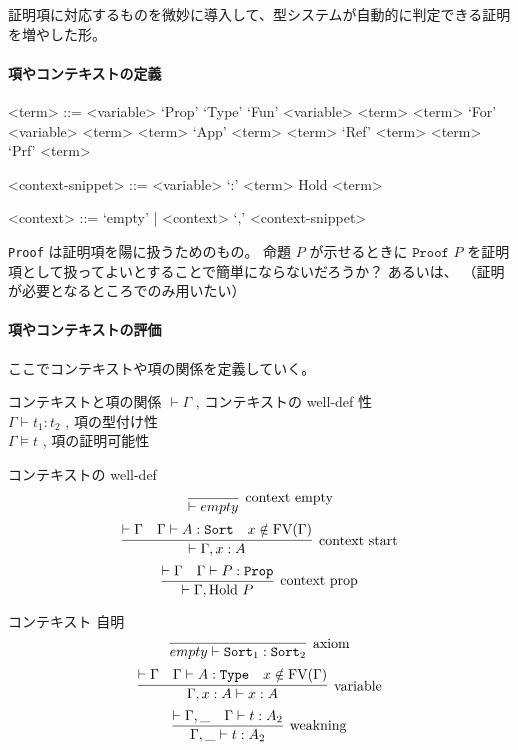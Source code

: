 証明項に対応するものを微妙に導入して、型システムが自動的に判定できる証明を増やした形。

\paragraph*{項やコンテキストの定義}
\begin{grammar}
<term> ::= <variable> 
\alt `Prop'
\alt `Type'
\alt `Fun' <variable> <term> <term>
\alt `For' <variable> <term> <term>
\alt `App' <term> <term>
\alt `Ref' <term> <term>
\alt `Prf' <term>

<context-snippet> ::= <variable> `:' <term>
\alt Hold <term>

<context> ::= `empty' | <context> `,' <context-snippet>
\end{grammar}

\texttt{Proof} は証明項を陽に扱うためのもの。
命題 \(P\) が示せるときに \(\texttt{Proof } P\) を証明項として扱ってよいとすることで簡単にならないだろうか？
あるいは、
（証明が必要となるところでのみ用いたい）

\paragraph*{項やコンテキストの評価}
ここでコンテキストや項の関係を定義していく。

\begin{itembox}[l]{コンテキストと項の関係}
  \(\vdash \Gamma\) , コンテキストの well-def 性 \\
  \(\Gamma \vdash t_1 : t_2\) , 項の型付け性 \\
  \(\Gamma \vDash t\) , 項の証明可能性
\end{itembox}

\begin{itembox}[l]{コンテキストの well-def}
  \[\infer[\text{context empty}]{\vdash empty}{}\]
  \[\infer[\text{context start}]{\vdash \Gamma , x : A}{\vdash \Gamma & \Gamma \vdash A : \texttt{Sort} & x \notin \text{FV}(\Gamma)}\]
  \[\infer[\text{context prop}]{\vdash \Gamma , \text{Hold } P}{\vdash \Gamma & \Gamma \vdash P : \texttt{Prop}}\]
\end{itembox}

\begin{itembox}[l]{コンテキスト 自明}
  \[\infer[\text{axiom}]{empty \vdash \texttt{Sort}_1 : \texttt{Sort}_2}{}\]
  \[\infer[\text{variable}]{\Gamma , x : A \vdash x : A}{\vdash \Gamma & \Gamma \vdash A : \texttt{Type} & x \notin \text{FV}(\Gamma)}\]
  \[\infer[\text{weakning}]{\Gamma , \_ \vdash t : A_2}{\vdash \Gamma , \_ & \Gamma \vdash t : A_2} \]
\end{itembox}


